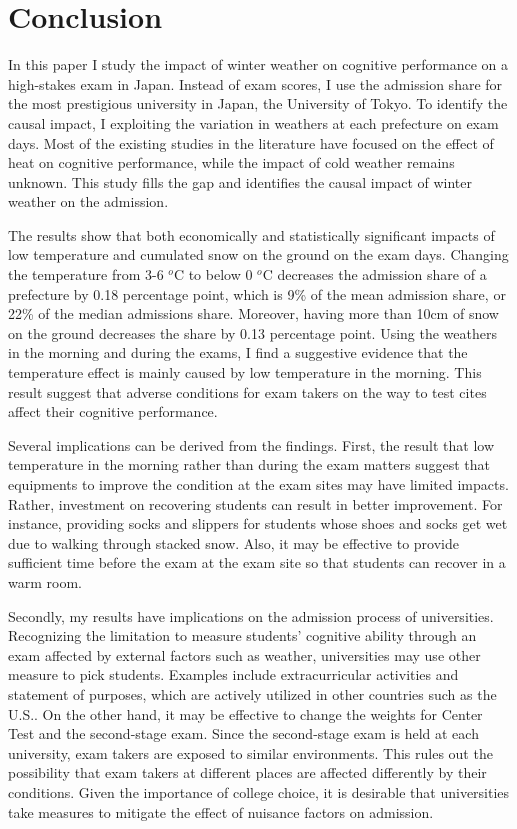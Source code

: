 \documentclass[12pt,letterpaper]{article}
\begin{document}
\section{Conclusion}

In this paper I study the impact of winter weather on cognitive performance on a high-stakes exam in Japan.
Instead of exam scores, I use the admission share for the most prestigious university in Japan, the University of Tokyo.
To identify the causal impact, I exploiting the variation in weathers at each prefecture on exam days.
Most of the existing studies in the literature have focused on the effect of heat on cognitive performance, while the impact of cold weather remains unknown.
This study fills the gap and identifies the causal impact of winter weather on the admission.

The results show that both economically and statistically significant impacts of low temperature and cumulated snow on the ground on the exam days.
Changing the temperature from 3-6 $^o$C to below 0 $^o$C decreases the admission share of a prefecture by 0.18 percentage point, which is 9\% of the mean admission share, or 22\% of the median admissions share.
Moreover, having more than 10cm of snow on the ground decreases the share by 0.13 percentage point.
Using the weathers in the morning and during the exams, I find a suggestive evidence that the temperature effect is mainly caused by low temperature in the morning.
This result suggest that adverse conditions for exam takers on the way to test cites affect their cognitive performance.

Several implications can be derived from the findings.
First, the result that low temperature in the morning rather than during the exam matters suggest that equipments to improve the condition at the exam sites may have limited impacts.
Rather, investment on recovering students can result in better improvement.
For instance, providing socks and slippers for students whose shoes and socks get wet due to walking through stacked snow.
Also, it may be effective to provide sufficient time before the exam at the exam site so that students can recover in a warm room.

Secondly, my results have implications on the admission process of universities.
Recognizing the limitation to measure students' cognitive ability through an exam affected by external factors such as weather, universities may use other measure to pick students.
Examples include extracurricular activities and statement of purposes, which are actively utilized in other countries such as the U.S..
On the other hand, it may be effective to change the weights for Center Test and the second-stage exam.
Since the second-stage exam is held at each university, exam takers are exposed to similar environments.
This rules out the possibility that exam takers at different places are affected differently by their conditions.
Given the importance of college choice, it is desirable that universities take measures to mitigate the effect of nuisance factors on admission.
\end{document}
